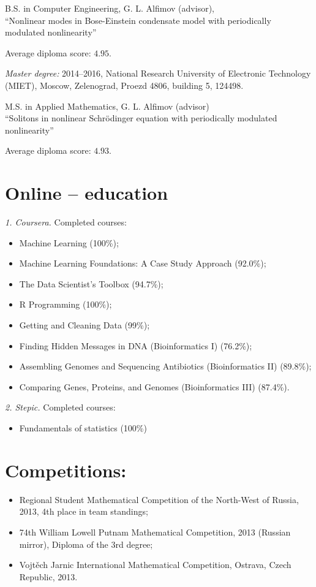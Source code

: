 \documentclass[margin, 10pt]{res} %
\begin{document}
\begin{resume}
B.S. in Computer Engineering, G. L. Alfimov (advisor), \\
``Nonlinear modes in Bose-Einstein condensate model with periodically modulated nonlinearity''

Average diploma score: $4.95$.

{\it Master degree:} 2014--2016,  National Research University of Electronic Technology (MIET), Moscow, Zelenograd, Proezd 4806, building 5, 124498.

M.S. in Applied Mathematics, G. L. Alfimov (advisor) \\
``Solitons in nonlinear Schr\"odinger equation with periodically modulated nonlinearity''

Average diploma score: $ 4.93$.

\section{Online -- education}
{\it 1. Coursera.} Completed courses:
\begin{itemize}
\item Machine Learning (100\%);
\item Machine Learning Foundations: A Case Study Approach (92.0\%);
\item The Data Scientist’s Toolbox (94.7\%);
\item R Programming (100\%);
\item Getting and Cleaning Data (99\%);
\item Finding Hidden Messages in DNA (Bioinformatics I) (76.2\%);
\item Assembling Genomes and Sequencing Antibiotics (Bioinformatics II) (89.8\%);
\item Comparing Genes, Proteins, and Genomes (Bioinformatics III) (87.4\%).
\end{itemize}

{\it 2. Stepic.} Completed courses:
\begin{itemize}
\item Fundamentals of statistics (100\%)
\end{itemize}

\section{Competitions:}
\begin{itemize}
\item Regional Student Mathematical Competition of the North-West of Russia, 2013, 4th place in team standings;
\item 74th William Lowell Putnam Mathematical Competition, 2013 (Russian mirror), Diploma of the 3rd degree;
\item Vojt\v{e}ch Jarnic International Mathematical Competition, Ostrava, Czech Republic, 2013.
\end{itemize}


\end{resume}
\end{document}
